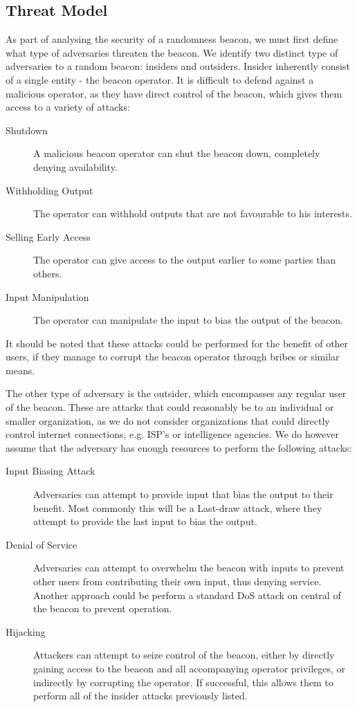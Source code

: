 \subsection{Threat Model}
As part of analysing the security of a randomness beacon, we must first define what type of adversaries threaten the beacon. We identify two distinct type of adversaries to a random beacon: insiders and outsiders. Insider inherently consist of a single entity - the beacon operator. It is difficult to defend against a malicious operator, as they have direct control of the beacon, which gives them access to a variety of attacks:

\begin{description}
    \item [Shutdown] A malicious beacon operator can shut the beacon down, completely denying availability. 
    \item [Withholding Output] The operator can withhold outputs that are not favourable to his interests. 
    \item [Selling Early Access] The operator can give access to the output earlier to some parties than others.
    \item [Input Manipulation] The operator can manipulate the input to bias the output of the beacon. 
\end{description} 

It should be noted that these attacks could be performed for the benefit of other users, if they manage to corrupt the beacon operator through bribes or similar means. 

The other type of adversary is the outsider, which encompasses any regular user of the beacon. These are attacks that could reasonably be to an individual or smaller organization, as we do not consider organizations that could directly control internet connections, e.g. ISP's or intelligence agencies. We do however assume that the adversary has enough resources to perform the following attacks: 

\begin{description}
    \item [Input Biasing Attack] Adversaries can attempt to provide input that bias the output to their benefit. Most commonly this will be a Last-draw attack, where they attempt to provide the last input to bias the output. 
    \item [Denial of Service] Adversaries can attempt to overwhelm the beacon with inputs to prevent other users from contributing their own input, thus denying service. Another approach could be perform a standard \gls{DoS} attack on central of the beacon to prevent operation.
    \item [Hijacking] Attackers can attempt to seize control of the beacon, either by directly gaining access to the beacon and all accompanying operator privileges, or indirectly by corrupting the operator. If successful, this allows them to perform all of the insider attacks previously listed.  
\end{description}




